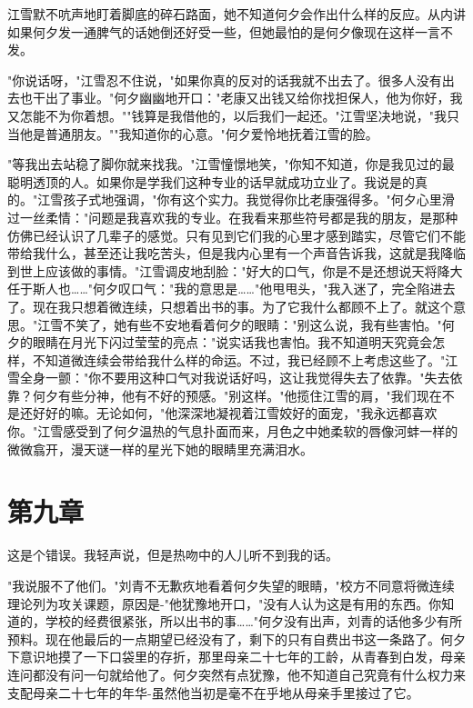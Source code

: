 \documentclass[UTF8]{ctexart}
\begin{document}
江雪默不吭声地盯着脚底的碎石路面，她不知道何夕会作出什么样的反应。从内讲如果何夕发一通脾气的话她倒还好受一些，但她最怕的是何夕像现在这样一言不发。

"你说话呀，"江雪忍不住说，"如果你真的反对的话我就不出去了。很多人没有出去也干出了事业。"何夕幽幽地开口："老康又出钱又给你找担保人，他为你好，我又怎能不为你着想。""钱算是我借他的，以后我们一起还。"江雪坚决地说，"我只当他是普通朋友。""我知道你的心意。"何夕爱怜地抚着江雪的脸。

"等我出去站稳了脚你就来找我。"江雪憧憬地笑，"你知不知道，你是我见过的最聪明透顶的人。如果你是学我们这种专业的话早就成功立业了。我说是的真的。"江雪孩子式地强调，"你有这个实力。我觉得你比老康强得多。"何夕心里滑过一丝柔情："问题是我喜欢我的专业。在我看来那些符号都是我的朋友，是那种仿佛已经认识了几辈子的感觉。只有见到它们我的心里才感到踏实，尽管它们不能带给我什么，甚至还让我吃苦头，但是我内心里有一个声音告诉我，这就是我降临到世上应该做的事情。"江雪调皮地刮脸："好大的口气，你是不是还想说天将降大任于斯人也……"何夕叹口气："我的意思是……"他甩甩头，"我入迷了，完全陷进去了。现在我只想着微连续，只想着出书的事。为了它我什么都顾不上了。就这个意思。"江雪不笑了，她有些不安地看着何夕的眼睛："别这么说，我有些害怕。"何夕的眼睛在月光下闪过莹莹的亮点："说实话我也害怕。我不知道明天究竟会怎样，不知道微连续会带给我什么样的命运。不过，我已经顾不上考虑这些了。"江雪全身一颤："你不要用这种口气对我说话好吗，这让我觉得失去了依靠。"失去依靠？何夕有些分神，他有不好的预感。"别这样。"他揽住江雪的肩，"我们现在不是还好好的嘛。无论如何，"他深深地凝视着江雪姣好的面宠，"我永远都喜欢你。"江雪感受到了何夕温热的气息扑面而来，月色之中她柔软的唇像河蚌一样的微微翕开，漫天谜一样的星光下她的眼睛里充满泪水。


\clearpage


\section*{第九章}

这是个错误。我轻声说，但是热吻中的人儿听不到我的话。

"我说服不了他们。"刘青不无歉疚地看着何夕失望的眼睛，"校方不同意将微连续理论列为攻关课题，原因是-"他犹豫地开口，"没有人认为这是有用的东西。你知道的，学校的经费很紧张，所以出书的事……"何夕没有出声，刘青的话他多少有所预料。现在他最后的一点期望已经没有了，剩下的只有自费出书这一条路了。何夕下意识地摸了一下口袋里的存折，那里母亲二十七年的工龄，从青春到白发，母亲连问都没有问一句就给他了。何夕突然有点犹豫，他不知道自己究竟有什么权力来支配母亲二十七年的年华-虽然他当初是毫不在乎地从母亲手里接过了它。
\end{document}
